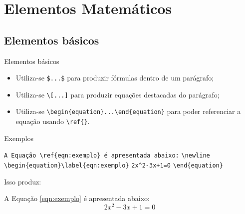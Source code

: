 \section{Elementos Matem\'aticos}
\subsection{Elementos b\'asicos}

\begin{frame}[fragile]{Elementos b\'asicos}
\begin{itemize}
\item Utiliza-se \verb|$...$| para produzir f\'ormulas dentro de um par\'agrafo;
\item Utiliza-se \verb|\[...]| para produzir equa{\c c}\~oes destacadas do par\'agrafo;
\item Utiliza-se \verb|\begin{equation}...\end{equation}| para poder referenciar a equa{\c c}\~ao usando \verb|\ref{}|.
\end{itemize}
\end{frame}


\begin{frame}[fragile]{Exemplos}

\verb|A Equação \ref{eqn:exemplo} é apresentada abaixo:|\newline
\verb|\newline| \newline
\verb|\begin{equation}\label{eqn:exemplo}|\newline
\verb|2x^2-3x+1=0|\newline
\verb|\end{equation}|\newline

Isso produz:\newline

A Equação \ref{eqn:exemplo} é apresentada abaixo: \newline
\begin{equation}\label{eqn:exemplo}
2x^2-3x+1=0
\end{equation}
\end{frame}


